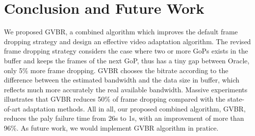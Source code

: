 \section{Conclusion and Future Work}
We proposed GVBR, a combined algorithm which improves the default frame dropping strategy and design an effective video adaptation algorithm. The revised frame dropping strategy considers the case where two or more GoPs exists in the buffer and keeps the frames of the next GoP, thus has a tiny gap between Oracle, only 5\% more frame dropping. GVBR chooses the bitrate according to the difference between the estimated bandwidth and the data size in buffer, which reflects much more accurately the real available bandwidth. Massive experiments illustrates that GVBR reduces 50\% of frame dropping compared with the state-of-art adaptation methods. All in all, our proposed combined algorithm, GVBR, reduces the paly failure time from 26s to 1s, with an improvement of more than 96\%.
As future work, we would implement GVBR algorithm in pratice. 